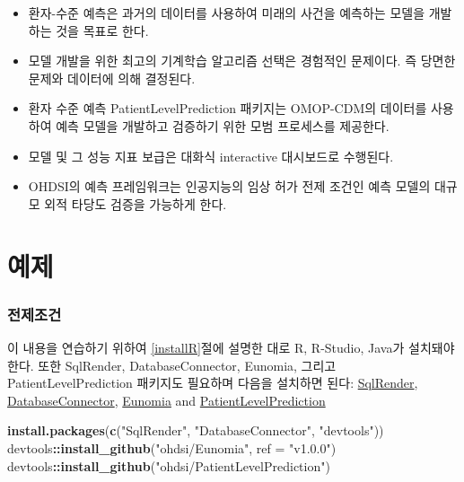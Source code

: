 \documentclass[10.5pt]{book}
\newenvironment{Shaded}{\begin{snugshade}}{\end{snugshade}}
\newcommand{\KeywordTok}[1]{\textcolor[rgb]{0.13,0.29,0.53}{\textbf{#1}}}
\newcommand{\DataTypeTok}[1]{\textcolor[rgb]{0.13,0.29,0.53}{#1}}
\newcommand{\StringTok}[1]{\textcolor[rgb]{0.31,0.60,0.02}{#1}}
\newcommand{\OperatorTok}[1]{\textcolor[rgb]{0.81,0.36,0.00}{\textbf{#1}}}
\newcommand{\NormalTok}[1]{#1}
\theoremstyle{definition}
\theoremstyle{definition}
\theoremstyle{definition}
\theoremstyle{remark}
\let\BeginKnitrBlock\begin \let\EndKnitrBlock\end
\begin{document}
\BeginKnitrBlock{rmdsummary}
\begin{itemize}
\item
  환자-수준 예측은 과거의 데이터를 사용하여 미래의 사건을 예측하는
  모델을 개발하는 것을 목표로 한다.
\item
  모델 개발을 위한 최고의 기계학습 알고리즘 선택은 경험적인 문제이다. 즉
  당면한 문제와 데이터에 의해 결정된다.
\item
  환자 수준 예측 PatientLevelPrediction 패키지는 OMOP-CDM의 데이터를
  사용하여 예측 모델을 개발하고 검증하기 위한 모범 프로세스를 제공한다.
\item
  모델 및 그 성능 지표 보급은 대화식 interactive 대시보드로 수행된다.
\item
  OHDSI의 예측 프레임워크는 인공지능의 임상 허가 전제 조건인 예측 모델의
  대규모 외적 타당도 검증을 가능하게 한다.
\end{itemize}
\EndKnitrBlock{rmdsummary}

\section{예제}\label{-8}

\subsubsection*{전제조건}\label{-6}

이 내용을 연습하기 위하여 \ref{installR}절에 설명한 대로 R, R-Studio,
Java가 설치돼야 한다. 또한 SqlRender, DatabaseConnector, Eunomia, 그리고
PatientLevelPrediction 패키지도 필요하며 다음을 설치하면 된다:
\href{https://ohdsi.github.io/SqlRender/}{SqlRender},
\href{https://ohdsi.github.io/DatabaseConnector/}{DatabaseConnector},
\href{https://ohdsi.github.io/Eunomia/}{Eunomia} and
\href{https://ohdsi.github.io/PatientLevelPrediction/}{PatientLevelPrediction}

\begin{Shaded}
\begin{Highlighting}[]
\KeywordTok{install.packages}\NormalTok{(}\KeywordTok{c}\NormalTok{(}\StringTok{"SqlRender"}\NormalTok{, }\StringTok{"DatabaseConnector"}\NormalTok{, }\StringTok{"devtools"}\NormalTok{))}
\NormalTok{devtools}\OperatorTok{::}\KeywordTok{install_github}\NormalTok{(}\StringTok{"ohdsi/Eunomia"}\NormalTok{, }\DataTypeTok{ref =} \StringTok{"v1.0.0"}\NormalTok{)}
\NormalTok{devtools}\OperatorTok{::}\KeywordTok{install_github}\NormalTok{(}\StringTok{"ohdsi/PatientLevelPrediction"}\NormalTok{)}
\end{Highlighting}
\end{Shaded}
\end{document}
